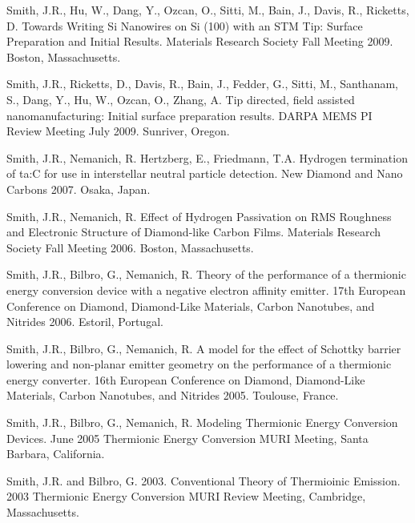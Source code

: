 \documentclass[letterpaper,margin,line]{res}
\begin{document}
\begin{resume}
Smith, J.R., Hu, W., Dang, Y., Ozcan, O., Sitti, M., Bain, J., Davis, R., Ricketts, D. Towards Writing Si Nanowires on Si (100) with an STM Tip: Surface Preparation and Initial Results. Materials Research Society Fall Meeting 2009. Boston, Massachusetts.

Smith, J.R., Ricketts, D., Davis, R., Bain, J., Fedder, G., Sitti, M., Santhanam, S., Dang, Y., Hu, W., Ozcan, O., Zhang, A. Tip directed, field assisted nanomanufacturing: Initial surface preparation results. DARPA MEMS PI Review Meeting July 2009. Sunriver, Oregon.

Smith, J.R., Nemanich, R. Hertzberg, E., Friedmann, T.A. Hydrogen termination of ta:C for use in interstellar neutral particle detection. New Diamond and Nano Carbons 2007. Osaka, Japan.

Smith, J.R., Nemanich, R. Effect of Hydrogen Passivation on RMS Roughness and Electronic Structure of Diamond-like Carbon Films. Materials Research Society Fall Meeting 2006. Boston, Massachusetts.

Smith, J.R., Bilbro, G., Nemanich, R. Theory of the performance of a thermionic energy conversion device with a negative electron affinity emitter. 17th European Conference on Diamond, Diamond-Like Materials, Carbon Nanotubes, and Nitrides 2006. Estoril, Portugal.


Smith, J.R., Bilbro, G., Nemanich, R. A model for the effect of Schottky barrier lowering and non-planar emitter geometry on the performance of a thermionic energy converter. 16th European Conference on Diamond, Diamond-Like Materials, Carbon Nanotubes, and Nitrides 2005. Toulouse, France.

Smith, J.R., Bilbro, G., Nemanich, R. Modeling Thermionic Energy Conversion Devices. June 2005 Thermionic Energy Conversion MURI Meeting, Santa Barbara, California.

Smith, J.R. and Bilbro, G. 2003. Conventional Theory of Thermioinic Emission. 2003 Thermionic Energy Conversion MURI Review Meeting, Cambridge, Massachusetts.


\end{resume}
\end{document}

